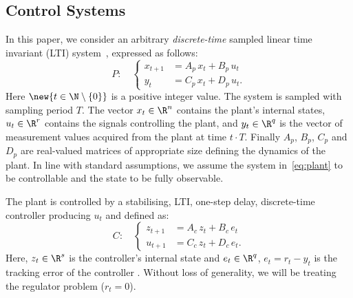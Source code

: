 %

\subsection{Control Systems}
\label{ssec:systemmodel}
In this paper, we consider an arbitrary \emph{discrete-time} sampled linear time invariant (LTI) system~\cite{Astrom:1997}, expressed as follows:
%
\begin{equation}
    \label{eq:plant}
    P:\quad
    \begin{cases}
        x_{t+1} &= A_p\,x_t + B_p\,u_t \\
        y_{t} &= C_p\,x_t + D_p\,u_t.
    \end{cases}
\end{equation}
%
Here $\new{t\in\N\setminus\left\{ 0 \right\}}$ is a positive integer value.
The system is sampled with sampling period $T$.
The vector $x_t\in\R^n$ contains the plant's internal states, $u_t\in\R^r$ contains the signals controlling the plant, and $y_t\in\R^q$ is the vector of measurement values acquired from the plant at time $t\cdot T$. Finally $A_p$, $B_p$, $C_p$ and $D_p$ are real-valued matrices of appropriate size defining the dynamics of the plant.
In line with standard assumptions, we assume the system in~\eqref{eq:plant} to be controllable and the state to be fully observable.

The plant is controlled by a stabilising, LTI, one-step delay,%
discrete-time controller producing $u_t$ and defined as:
%
\begin{equation}
    \label{eq:controller}
    C:\quad
    \begin{cases}
        z_{t+1} &= A_c\,z_t + B_c\,e_t \\
        u_{t+1} &= C_c\,z_t + D_c\,e_t.
    \end{cases}
\end{equation}
%
Here, $z_t\in\R^s$ is the controller's internal state and $e_t\in\R^q$, $e_t= r_t - y_t$ is the tracking error of the controller .
Without loss of generality, we will be treating the regulator problem ($r_t = 0$).

